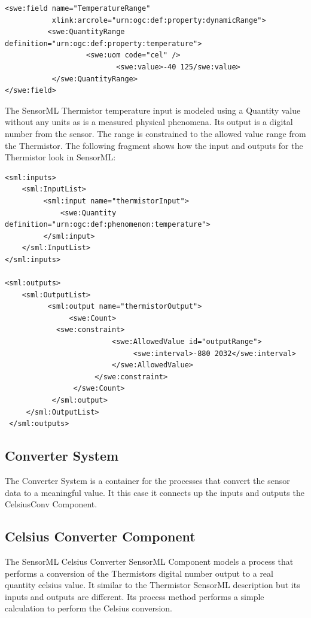 \documentclass[]{final_report}
\begin{document}
\begin{lstlisting}
<swe:field name="TemperatureRange" 
           xlink:arcrole="urn:ogc:def:property:dynamicRange">
          <swe:QuantityRange definition="urn:ogc:def:property:temperature">
                   <swe:uom code="cel" /> 
                          <swe:value>-40 125/swe:value> 
           </swe:QuantityRange>
</swe:field>
\end{lstlisting}

The SensorML Thermistor temperature input is modeled using a Quantity value without any units as is a measured physical phenomena. Its output is a digital number from the sensor. The range is constrained to the allowed value range from the Thermistor. The following fragment shows how the input and outputs for the Thermistor look in SensorML:

\begin{lstlisting}
<sml:inputs>
    <sml:InputList>
         <sml:input name="thermistorInput">
             <swe:Quantity definition="urn:ogc:def:phenomenon:temperature">
         </sml:input>
    </sml:InputList>
</sml:inputs>

<sml:outputs>
    <sml:OutputList>
          <sml:output name="thermistorOutput">
               <swe:Count>
	        <swe:constraint>
                         <swe:AllowedValue id="outputRange">
                              <swe:interval>-880 2032</swe:interval>
                         </swe:AllowedValue>
                     </swe:constraint>
                </swe:Count>
           </sml:output>
     </sml:OutputList>
 </sml:outputs>
\end{lstlisting}

\subsection{Converter System}
The Converter System is a container for the processes that convert the sensor data to a meaningful value. It this case it connects up the inputs and outputs the CelsiusConv Component. 
\subsection{Celsius Converter Component}

The SensorML Celsius Converter SensorML Component  models a process that performs a conversion of the Thermistors digital number output to a real quantity celsius value. It similar to the Thermistor SensorML description but its inputs and outputs are different. Its process method performs a simple calculation to perform the Celsius conversion.
\end{document}
